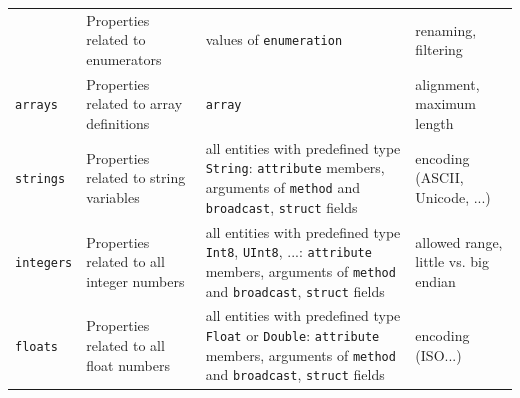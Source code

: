 \documentclass[a4paper,10pt]{scrreprt}
\newlength{\XdocTEffectiveWidth}
\begin{document}
\begin{table}
\begin{tabular}{p{0.13\XdocTEffectiveWidth}p{0.38\XdocTEffectiveWidth}p{0.25\XdocTEffectiveWidth}p{0.25\XdocTEffectiveWidth}}
 & Properties related to enumerators

 & values of \protect\lstinline[language=Franca]�enumeration�

 & renaming, filtering

\\
\protect\lstinline[language=FDeploy]�arrays�

 & Properties related to array definitions

 & \protect\lstinline[language=Franca]�array�

 & alignment, maximum length

\\
\protect\lstinline[language=FDeploy]�strings�

 & Properties related to string variables

 & all entities with predefined type \protect\lstinline[language=Franca]�String�:
			\protect\lstinline[language=Franca]�attribute� members,
			arguments of \protect\lstinline[language=Franca]�method� and \protect\lstinline[language=Franca]�broadcast�,
			\protect\lstinline[language=Franca]�struct� fields

 & encoding (ASCII, Unicode, ...)

\\
\protect\lstinline[language=FDeploy]�integers�

 & Properties related to all integer numbers

 & all entities with predefined type \protect\lstinline[language=Franca]�Int8�, \protect\lstinline[language=Franca]�UInt8�, ...:
			\protect\lstinline[language=Franca]�attribute� members,
			arguments of \protect\lstinline[language=Franca]�method� and \protect\lstinline[language=Franca]�broadcast�,
			\protect\lstinline[language=Franca]�struct� fields

 & allowed range, little vs. big endian

\\
\protect\lstinline[language=FDeploy]�floats�

 & Properties related to all float numbers

 & all entities with predefined type \protect\lstinline[language=Franca]�Float� or \protect\lstinline[language=Franca]�Double�:
			\protect\lstinline[language=Franca]�attribute� members,
			arguments of \protect\lstinline[language=Franca]�method� and \protect\lstinline[language=Franca]�broadcast�,
			\protect\lstinline[language=Franca]�struct� fields

 & encoding (ISO...)


\end{tabular}
\end{table}
\end{document}

